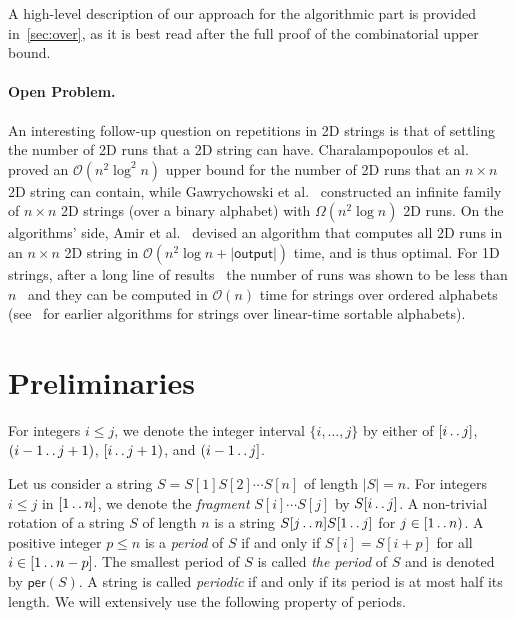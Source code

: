 \documentclass[11pt,letterpaper]{article}
\newcommand{\cO}{\mathcal{O}}
\def\dd{\mathinner{.\,.}}
\newcommand{\per}{\textsf{per}}
\begin{document}
A high-level description of our approach for the algorithmic part is provided in~\cref{sec:over}, as it is best read after the full proof of the combinatorial upper bound.

\paragraph{Open Problem.}
An interesting follow-up question on repetitions in 2D strings is that of settling the number of 2D runs that a 2D string can
have.
Charalampopoulos et al.~\cite{CRRWZ} proved an $\cO(n^2\log^2 n)$ upper bound for the number of 2D runs that an
$n \times n$ 2D string can contain, while Gawrychowski et al.~\cite{GGL} constructed an infinite family of $n\times n$ 2D strings
(over a binary alphabet) with $\Omega(n^2 \log n)$ 2D runs.
On the algorithms' side, Amir et al.~\cite{Amir2020} devised an algorithm that computes all 2D runs in an $n \times n$ 2D
string in $\cO(n^2 \log n + |\textsf{output}|)$ time, and is thus optimal.
For 1D strings, after a long line of results~\cite{KK:99,Rytter2006,Crochemore2008,Crochemore2011,Giraud2008,Giraud2009,PuglisiSS08} the number of runs was shown to be less than $n$~\cite{runstheorem} and they can be computed in $\cO(n)$ time for strings over ordered alphabets~\cite{ellert_et_al:LIPIcs.ICALP.2021.63} (see~\cite{KK:99,runstheorem} for earlier algorithms for strings over linear-time sortable alphabets).

\section{Preliminaries}
\label{preliminaries}
For integers $i\leq j$,
we denote the integer interval $\{i, \ldots, j\}$ by either of $[i \dd j]$, $(i-1 \dd j+1)$, $[i \dd j+1)$, and $(i-1 \dd j]$.

Let us consider a string $S=S[1]S[2]\cdots S[n]$ of length $|S|=n$.
For integers $i \leq j$ in $[1 \dd n]$, we denote the \emph{fragment} $S[i]\cdots S[j]$ by $S[i \dd j]$.
A non-trivial rotation of a string $S$ of length $n$ is a string $S[j\dd n]S[1\dd j]$ for $j \in [1\dd n)$.
A positive integer $p \leq n$ is a \emph{period} of $S$  if and only if $S[i]=S[i+p]$ for all $i \in [1 \dd n-p]$.
The smallest period of $S$ is called \emph{the period} of $S$ and is denoted by $\per(S)$.
A string is called \emph{periodic} if and only if its period is at most half its length.
We will extensively use the following property of periods.
\end{document}
